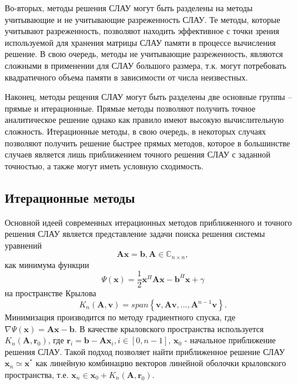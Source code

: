 Во-вторых, методы решения СЛАУ могут быть разделены на методы учитывающие и не учитывающие разреженность СЛАУ. Те методы, которые учитывают разреженность, позволяют находить эффективное с точки зрения используемой для хранения матрицы СЛАУ памяти в процессе вычисления решение. В свою очередь, методы не учитывающие разреженность, являются сложными в применении для СЛАУ большого размера, т.к. могут потребовать квадратичного объема памяти в зависимости от числа неизвестных.

Наконец, методы рещения СЛАУ могут быть разделены две основные группы -- прямые и итерационные. Прямые методы позволяют получить точное аналитическое решение однако как правило имеют высокую вычислительную сложность. Итерационные методы, в свою очередь, в некоторых случаях позволяют получить решение быстрее прямых методов, которое в большинстве случаев является лишь приближением точного решения СЛАУ с заданной точностью, а также могут иметь условную сходимость.

\subsection{Итерационные методы}
Основной идеей современных итерационных методов приближенного и точного решения СЛАУ является представление задачи поиска решения системы уравнений
\begin{equation*}
  \mathbf{A}\mathbf{x} = \mathbf{b}, \mathbf{A} \in \mathbb{C}_{n \times n},
 \end{equation*}
как минимума функции 
\begin{equation*}
  \Psi(\mathbf{x}) = \frac{1}{2}\mathbf{x}^H \mathbf{A} \mathbf{x} - \mathbf{b}^H \mathbf{x} + \gamma
\end{equation*}
на пространстве Крылова 
\begin{equation*}
  K_n(\mathbf{A}, \mathbf{v}) = span\left\{ \mathbf{v}, \mathbf{A}\mathbf{v}, ..., \mathbf{A}^{n-1}\mathbf{v} \right\}. 
\end{equation*}
Минимизация производится по методу градиентного спуска, где $\nabla\Psi(\mathbf{x}) = \mathbf{A}\mathbf{x} - \mathbf{b}$. В качестве крыловского пространства используется $K_n(\mathbf{A}, \mathbf{r}_0)$, где $\mathbf{r}_i = \mathbf{b} - \mathbf{A}\mathbf{x}_i, i \in [0, n-1]$, $\mathbf{x}_0$ - начальное приближение решения СЛАУ. Такой подход позволяет найти приближенное решение СЛАУ $\mathbf{x}_n \simeq \mathbf{x}^*$ как линейную комбинацию векторов линейной оболочки крыловского пространства, т.е. $\mathbf{x}_n \in \mathbf{x}_0 + K_n(\mathbf{A}, \mathbf{r}_0)$.


